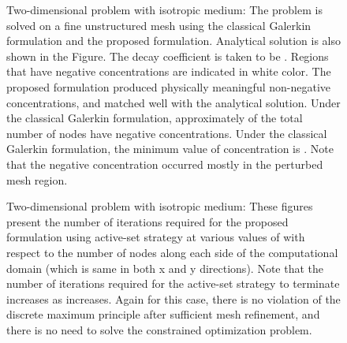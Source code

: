 \documentclass[11pt]{amsart}
\begin{document}
\begin{figure}      
\caption{Two-dimensional problem with isotropic medium: The problem is solved on a fine 
    unstructured mesh using the classical Galerkin formulation and the proposed formulation. 
    Analytical solution is also shown in the Figure. The decay coefficient is taken to be 
    . Regions that have negative concentrations are indicated in white color. 
    The proposed formulation produced physically meaningful non-negative concentrations, 
    and matched well with the analytical solution. Under the classical Galerkin formulation, 
    approximately  of the total number of nodes have negative concentrations. 
    Under the classical Galerkin formulation, the  minimum value of concentration is  
    . Note that the negative concentration occurred mostly in the perturbed 
    mesh region.} \label{Fig:Decay_2D_perturbed_mesh}
\end{figure}

\begin{figure}[!h]
  \centering
\caption{Two-dimensional problem with isotropic medium: These figures present the 
    number of iterations required for the proposed formulation using active-set 
    strategy at various values of  with respect to the number of nodes along 
    each side of the computational domain (which is same in both x and y directions). 
    Note that the number of iterations required for the active-set strategy to terminate 
    increases as  increases. Again for this case, there is no violation of the 
    discrete maximum principle after sufficient mesh refinement, and there is no need 
    to solve the constrained optimization problem.} \label{Fig:Decay_2D_active_set_iterations}
\end{figure}
\end{document}
